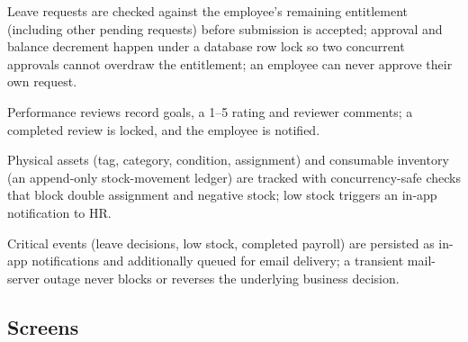 \begin{reqlist}
  \item Leave requests are checked against the employee's remaining
    entitlement (including other pending requests) before submission is
    accepted; approval and balance decrement happen under a database row
    lock so two concurrent approvals cannot overdraw the entitlement; an
    employee can never approve their own request.
  \item Performance reviews record goals, a 1--5 rating and reviewer
    comments; a completed review is locked, and the employee is notified.
  \item Physical assets (tag, category, condition, assignment) and
    consumable inventory (an append-only stock-movement ledger) are tracked
    with concurrency-safe checks that block double assignment and negative
    stock; low stock triggers an in-app notification to HR.
  \item Critical events (leave decisions, low stock, completed payroll) are
    persisted as in-app notifications and additionally queued for email
    delivery; a transient mail-server outage never blocks or reverses the
    underlying business decision.
\end{reqlist}

\subsection{Screens}
